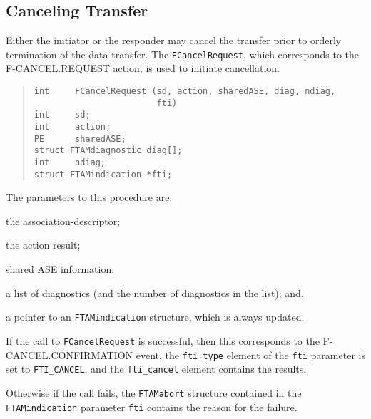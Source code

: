 \subsection	{Canceling Transfer}
Either the initiator or the responder may cancel the transfer prior to
orderly termination of the data transfer.
The \verb"FCancelRequest",
which corresponds to the {\sf F-CANCEL.REQUEST\/} action,
is used to initiate cancellation.
\begin{quote}\small\begin{verbatim}
int     FCancelRequest (sd, action, sharedASE, diag, ndiag,
                        fti)
int     sd;
int     action;
PE      sharedASE;
struct FTAMdiagnostic diag[];
int     ndiag;
struct FTAMindication *fti;
\end{verbatim}\end{quote}
The parameters to this procedure are:
\begin{describe}
\item[\verb"sd":] the association-descriptor;

\item[\verb"action":] the action result;

\item[\verb"sharedASE":] shared ASE information;

\item[\verb"diag"/\verb"ndiag":] a list of diagnostics
(and the number of diagnostics in the list);
and,

\item[\verb"fti":] a pointer to an \verb"FTAMindication" structure, which is
always updated.
\end{describe}
If the call to \verb"FCancelRequest" is successful,
then this corresponds to the {\sf F-CANCEL.CONFIRMATION\/} event,
the \verb"fti_type" element of the \verb"fti" parameter is set to
\verb"FTI_CANCEL",
and the \verb"fti_cancel" element contains the results.

Otherwise if the call fails,
the \verb"FTAMabort" structure contained in the
\verb"FTAMindication" parameter \verb"fti" contains the reason for the failure.

